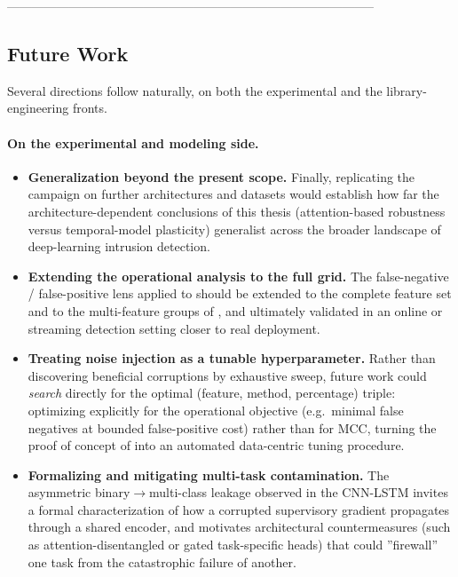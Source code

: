 \documentclass[../main.tex]{subfiles}
\begin{document}
-----------------------------------------------------------------------------------------


\newpage
\subsection{Future Work}
\label{sec:future-work}

Several directions follow naturally, on both the experimental and the library-engineering fronts.

\paragraph{On the experimental and modeling side.}
\begin{itemize}
    \item \textbf{Generalization beyond the present scope.} Finally, replicating the campaign on further architectures and datasets would establish how far the architecture-dependent conclusions of this thesis (attention-based robustness versus temporal-model plasticity) generalist across the broader landscape of deep-learning intrusion detection.
    
    \item \textbf{Extending the operational analysis to the full grid.} The false-negative / false-positive lens applied to  should be extended to the complete feature set and to the multi-feature groups of , and ultimately validated in an online or streaming detection setting closer to real deployment.

    \item \textbf{Treating noise injection as a tunable hyperparameter.} Rather than discovering beneficial corruptions by exhaustive sweep, future work could \emph{search} directly for the optimal (feature, method, percentage) triple: optimizing explicitly for the operational objective (e.g.\ minimal false negatives at bounded false-positive cost) rather than for MCC, turning the proof of concept of  into an automated data-centric tuning procedure.
    
    \item \textbf{Formalizing and mitigating multi-task contamination.} The asymmetric binary$\rightarrow$multi-class leakage observed in the CNN-LSTM invites a formal characterization of how a corrupted supervisory gradient propagates through a shared encoder, and motivates architectural countermeasures (such as attention-disentangled or gated task-specific heads) that could ''firewall'' one task from the catastrophic failure of another.    
\end{itemize}
\end{document}
